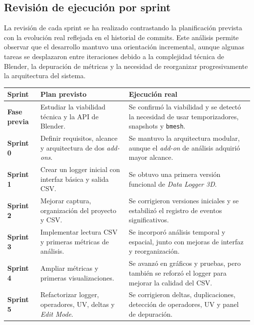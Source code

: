 \subsection{Revisión de ejecución por sprint}
\label{subsec:a-revision-sprints}

La revisión de cada sprint se ha realizado contrastando la planificación prevista con la evolución real reflejada en el historial de commits. Este análisis permite observar que el desarrollo mantuvo una orientación incremental, aunque algunas tareas se desplazaron entre iteraciones debido a la complejidad técnica de Blender, la depuración de métricas y la necesidad de reorganizar progresivamente la arquitectura del sistema.

\begin{table}[H]
\centering
\tiny
\renewcommand{\arraystretch}{1.1}
\begin{tabularx}{\textwidth}{p{1.8cm}X X}
\toprule
\textbf{Sprint} & \textbf{Plan previsto} & \textbf{Ejecución real} \\
\midrule
\textbf{Fase previa} &
Estudiar la viabilidad técnica y la API de Blender. &
Se confirmó la viabilidad y se detectó la necesidad de usar temporizadores, snapshots y \texttt{bmesh}. \\

\textbf{Sprint 0} &
Definir requisitos, alcance y arquitectura de dos \textit{add-ons}. &
Se mantuvo la arquitectura modular, aunque el \textit{add-on} de análisis adquirió mayor alcance. \\

\textbf{Sprint 1} &
Crear un logger inicial con interfaz básica y salida CSV. &
Se obtuvo una primera versión funcional de \textit{Data Logger 3D}. \\

\textbf{Sprint 2} &
Mejorar captura, organización del proyecto y CSV. &
Se corrigieron versiones iniciales y se estabilizó el registro de eventos significativos. \\

\textbf{Sprint 3} &
Implementar lectura CSV y primeras métricas de análisis. &
Se incorporó análisis temporal y espacial, junto con mejoras de interfaz y reorganización. \\

\textbf{Sprint 4} &
Ampliar métricas y primeras visualizaciones. &
Se avanzó en gráficos y pruebas, pero también se reforzó el logger para mejorar la calidad del CSV. \\

\textbf{Sprint 5} &
Refactorizar logger, operadores, UV, deltas y \textit{Edit Mode}. &
Se corrigieron deltas, duplicaciones, detección de operadores, UV y panel de depuración. \\


\end{tabularx}
\end{table}
